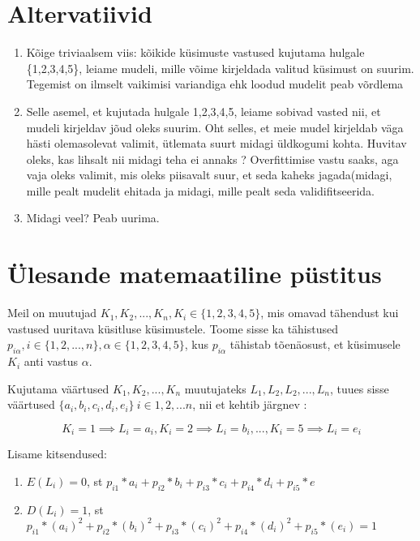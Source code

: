 \documentclass{article}
\begin{document}
\section*{Altervatiivid}

\begin{enumerate}
\item Kõige triviaalsem viis: kõikide k\"usimuste vastused kujutama hulgale \{1,2,3,4,5\}, leiame mudeli, mille võime kirjeldada valitud k\"usimust on suurim. Tegemist on ilmselt vaikimisi variandiga ehk loodud mudelit peab võrdlema 
\item Selle asemel, et kujutada hulgale {1,2,3,4,5}, leiame sobivad vasted nii, et mudeli kirjeldav jõud oleks suurim. Oht selles, et meie mudel kirjeldab väga hästi olemasolevat valimit, \"utlemata suurt midagi \"uldkogumi kohta. {\color{blue} Huvitav oleks, kas lihsalt nii midagi teha ei annaks ? Overfittimise vastu saaks, aga vaja oleks valimit, mis oleks piisavalt suur, et seda kaheks jagada(midagi, mille pealt mudelit ehitada ja midagi, mille pealt seda validifitseerida}. 
\item {\color{blue} Midagi veel? Peab uurima.}
\end{enumerate}

\section*{\"Ulesande matemaatiline p\"ustitus}


Meil on muutujad $K_1,K_2,...,K_n, K_i \in \{1,2,3,4,5\}$, mis omavad tähendust kui vastused uuritava k\"usitluse k\"usimustele. Toome sisse ka tähistused $p_{i \alpha}, i \in \{1,2,...,n\}, \alpha \in \{1,2,3,4,5\}$, kus $p_{i \alpha}$ tähistab tõenäosust, et k\"usimusele $K_i$ anti vastus $\alpha$. 

Kujutama väärtused $K_1,K_2,...,K_n$ muutujateks  $L_1, L_2,L_2,...,L_n$, tuues sisse väärtused $\{a_i,b_i,c_i,d_i,e_i\} ~ i \in {1,2,...n}$, nii et kehtib järgnev : 

\begin{equation*}
K_i = 1 \implies L_i = a_i, K_i = 2 \implies L_i = b_i,..., K_i = 5 \implies L_i = e_i
\end{equation*}


Lisame kitsendused:
\begin{enumerate}
\item $E(L_i) = 0$, st $ p_{i1}*a_i+p_{i2}*b_i+p_{i3}*c_i+p_{i4}*d_i+p_{i5}*e$

\item $D(L_i) = 1$, st $p_{i1}*(a_i)^2+ p_{i2}*(b_i)^2 + p_{i3}*(c_i)^2 + p_{i4}*(d_i)^2 + p_{i5}*(e_i) = 1 $
\end{enumerate} 
\end{document}
